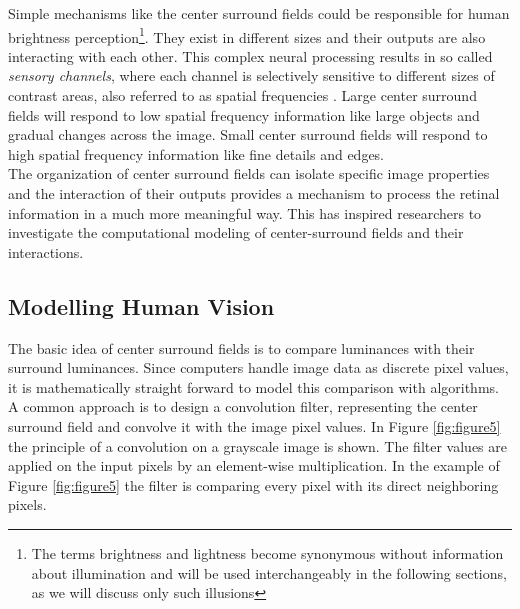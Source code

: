 Simple mechanisms like the center surround fields could be responsible for human
brightness perception\footnote{The terms brightness and lightness become synonymous
without information about illumination and will be used interchangeably in the following
sections, as we will discuss only such illusions}. They exist in different sizes and
their outputs are also interacting with each other. This complex neural processing
results in so called \emph{sensory channels}, where each channel is selectively sensitive
to different sizes of contrast areas, also referred to as spatial frequencies
\parencite{Sachs71}. Large center surround fields will respond to low spatial frequency
information like large objects and gradual changes across the image. Small center surround
fields will respond to high spatial frequency information like fine details and edges.\\
The organization of center surround fields can isolate specific image properties and the
interaction of their outputs provides a mechanism to process the retinal information in a
much more meaningful way. This has inspired researchers to investigate the computational
modeling of center-surround fields and their interactions.


\subsection{Modelling Human Vision}

The basic idea of center surround fields is to compare luminances with their surround
luminances. Since computers handle image data as discrete pixel values, it is
mathematically straight forward to model this comparison with algorithms. A common
approach is to design a convolution filter, representing the center surround field and
convolve it with the image pixel values. In Figure \ref{fig:figure5} the principle of a
convolution on a grayscale image is shown. The filter values are applied on the input
pixels by an element-wise multiplication. In the example of Figure \ref{fig:figure5} the
filter is comparing every pixel with its direct neighboring pixels.

